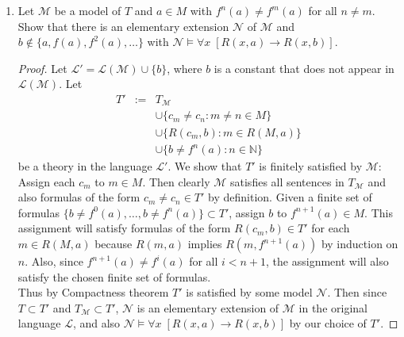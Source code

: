 \documentclass{article}
\begin{document}
\begin{enumerate}[label={\bf Q\arabic*:}]
\begin{enumerate}
\begin{proof}
          These relations will ensure that $\mathcal{N}$ is a model of $T$
          and that $c$. Also, since $b\neq f^n(a)$ for all
          $n\in\mathbb{N}$, $c$ will witness $\mathcal{N}\models \exists x\;
          (R(x,a)\wedge\neg R(x,b))$. Also, since the new relations each
          involve the new element $c$, $\mathcal{N}$ is an extension of
          $\mathcal{M}$. Thus, from existential closure of $\mathcal{M}$,
          we have $\mathcal{M}\models \exists x\; (R(x,a)\wedge\neg
          R(x,b))$, a contradiction.
        \end{proof}

      \item Let $\mathcal{M}$ be a model of $T$ and $a\in M$ with
        $f^n(a)\neq f^m(a)$ for all $n\neq m$. Show that there is an
        elementary extension $\mathcal{N}$ of $\mathcal{M}$ and
        $b\not\in\{a,f(a),f^2(a),\ldots\}$ with $\mathcal{N}\models\forall
        x\; [R(x,a)\rightarrow R(x,b)]$.

        \begin{proof}
          Let $\mathcal{L}'=\mathcal{L}(\mathcal{M})\cup\{b\}$, where $b$
          is a constant that does not appear in $\mathcal{L}(\mathcal{M})$.
          Let
          \[\begin{array}{rrl}
            T' &:= &T_\mathcal{M} \\
              &&\cup \{c_m\neq c_n:m\neq n\in M\} \\
              &&\cup\{R(c_m,b):m\in R(M,a)\} \\
              &&\cup\{b\neq f^n(a):n\in\mathbb{N}\}
          \end{array}\]
          be a theory in the language $\mathcal{L}'$. We show that
          $T'$ is finitely satisfied by $\mathcal{M}$: Assign each $c_m$ to
          $m\in M$. Then clearly $\mathcal{M}$ satisfies all sentences in
          $T_\mathcal{M}$ and also formulas of the form $c_m\neq c_n\in
          T'$ by definition. Given a finite set of formulas
          $\{b\neq f^{0}(a),\ldots,b\neq f^{n}(a)\}\subset T'$, assign $b$
          to $f^{n+1}(a)\in M$. This assignment will satisfy formulas of
          the form $R(c_m,b)\in T'$ for each $m\in R(M,a)$ because $R(m,a)$
          implies $R(m,f^{n+1}(a))$ by induction on $n$. Also, since
          $f^{n+1}(a)\neq f^i(a)$ for all $i<n+1$, the assignment will also
          satisfy the chosen finite set of formulas. \\

          Thus by Compactness theorem $T'$ is satisfied by some model
          $\mathcal{N}$. Then since $T\subset T'$ and $T_\mathcal{M}\subset
          T'$, $\mathcal{N}$ is an elementary extension of $\mathcal{M}$ in
          the original language $\mathcal{L}$, and also
          $\mathcal{N}\models\forall x\; [R(x,a)\rightarrow R(x,b)]$ by our
          choice of $T'$.
        \end{proof}


\end{enumerate}
\end{enumerate}
\end{document}
